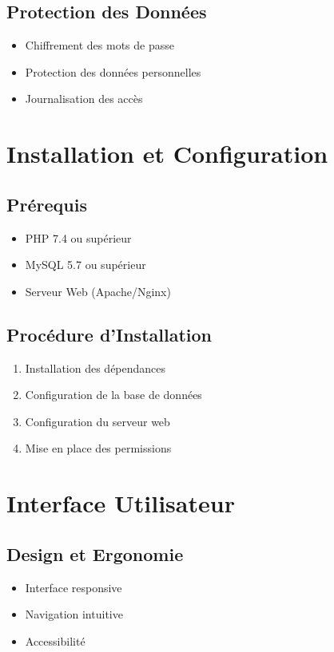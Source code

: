 \documentclass[12pt,a4paper]{report}
\begin{document}
\section{Protection des Données}
\begin{itemize}
    \item Chiffrement des mots de passe
    \item Protection des données personnelles
    \item Journalisation des accès
\end{itemize}

\chapter{Installation et Configuration}
\section{Prérequis}
\begin{itemize}
    \item PHP 7.4 ou supérieur
    \item MySQL 5.7 ou supérieur
    \item Serveur Web (Apache/Nginx)
\end{itemize}

\section{Procédure d'Installation}
\begin{enumerate}
    \item Installation des dépendances
    \item Configuration de la base de données
    \item Configuration du serveur web
    \item Mise en place des permissions
\end{enumerate}

\chapter{Interface Utilisateur}
\section{Design et Ergonomie}
\begin{itemize}
    \item Interface responsive
    \item Navigation intuitive
    \item Accessibilité
\end{itemize}
\end{document}
